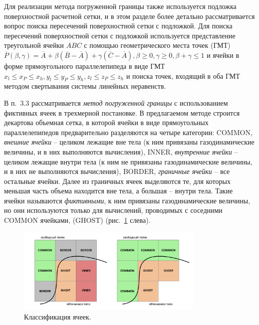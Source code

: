 \documentclass[a4paper,14pt]{extarticle}                     %
\theoremstyle{plain}                                         %
\begin{document}
Для реализации метода погруженной границы также используется подложка поверхностной расчетной сетки, и в этом разделе более детально рассматривается вопрос поиска пересечений поверхностной сетки с подложкой.
Для поиска пересечений поверхностной сетки с подложкой используется представление треугольной ячейки $ABC$ с помощью геометрического места точек (ГМТ) $\overline{P}(\beta, \gamma) = \overline{A} + \beta (\overline{B} - \overline{A}) + \gamma (\overline{C} - \overline{A}), \beta \ge 0, \gamma \ge 0, \beta + \gamma \le 1$ и ячейки в форме прямоугольного параллелепипеда в виде ГМТ $x_l \le x_P \le x_h, y_l \le y_P \le y_h, z_l \le z_P \le z_h$ и поиска точек, входящий в оба ГМТ методом свертывания системы линейных неравенств.


В п.~3.3 рассматривается \textit{метод погруженной границы} с использованием фиктивных ячеек в трехмерной постановке.
В предлагаемом методе строится декартова объемная сетка, в которой ячейки в виде прямоугольных параллелепипедов предварительно разделяются на четыре категории:
COMMON, \textit{внешние ячейки} -- целиком лежащие вне тела (к ним привязаны газодинамические величины, и в них выполняются вычисления), INNER, \textit{внутренние ячейки} -- целиком лежащие внутри тела (к ним не привязаны газодинамические величины, и в них не выполняются вычисления), BORDER, \textit{граничные ячейки} -- все остальные ячейки.
Далее из граничных ячеек выделяются те, для которых меньшая часть объема находится вне тела, а большая -- внутри тела.
Такие ячейки называются \textit{фиктивными}, к ним привязаны газодинамические величины, но они используются только для вычислений, проводимых с соседними COMMON ячейками, (GHOST) (рис.~\ref{fig:text_1_immersed_boundary_method_class} слева).

\begin{figure}[ht]
\centering
\includegraphics[width=0.8\textwidth]{./pics/text_1_immersed_boundary_method/cells_classification.pdf}
\singlespacing
\caption{Классификация ячеек.}
\label{fig:text_1_immersed_boundary_method_class}
\end{figure}
\end{document}
